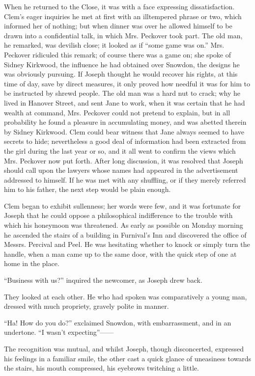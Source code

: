 When he returned to the Close, it was with a face expressing
dissatisfaction. Clem's eager inquiries he met at first with an
illtempered phrase or two, which informed her of nothing; but when
dinner was over he allowed himself to be drawn into a confidential talk,
in which Mrs. Peckover took part. The old man, he remarked, was devilish
{}close; it looked as if ``some game was on.'' Mrs. Peckover ridiculed
this remark; of course there was a game on; she spoke of Sidney
Kirkwood, the influence he had obtained over Snowdon, the designs he was
obviously pursuing. If Joseph thought he would recover his rights, at
this time of day, save by direct measures, it only proved how needful it
was for him to be instructed by shrewd people. The old man was a hard
nut to crack; why he lived in Hanover Street, and sent Jane to work,
when it was certain that he had wealth at command, Mrs. Peckover could
not pretend to explain, but in all probability he found a pleasure in
accumulating money, and was abetted therein by Sidney Kirkwood. Clem
could bear witness that Jane always seemed to have secrets to hide;
nevertheless a good deal of information had been extracted from the girl
during the last year or so, and it all went to confirm the views which
Mrs. Peckover now put forth. After long discussion, it was resolved that
Joseph should call upon the lawyers whose {}names had appeared in the
advertisement addressed to himself. If he was met with any shuffling, or
if they merely referred him to his father, the next step would be plain
enough.

Clem began to exhibit sullenness; her words were few, and it was
fortunate for Joseph that he could oppose a philosophical indifference
to the trouble with which his honeymoon was threatened. As early as
possible on Monday morning he ascended the stairs of a building in
Furnival's Inn and discovered the office of Messrs. Percival and Peel.
He was hesitating whether to knock or simply turn the handle, when a man
came up to the same door, with the quick step of one at home in the
place.

``Business with us?'' inquired the newcomer, as Joseph drew back.

They looked at each other. He who had spoken was comparatively a young
man, dressed with much propriety, gravely polite in manner.

``Ha! How do you do?'' exclaimed {}Snowdon, with embarrassment, and in
an undertone. ``I wasn't expecting''{{------}}

The recognition was mutual, and whilst Joseph, though disconcerted,
expressed his feelings in a familiar smile, the other cast a quick
glance of uneasiness towards the stairs, his mouth compressed, his
eyebrows twitching a little.

